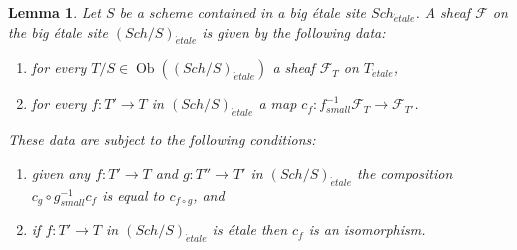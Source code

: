 \documentclass{stacks-project}
\theoremstyle{plain}
\newtheorem{lemma}[subsection]{Lemma}
\theoremstyle{definition}
\theoremstyle{remark}
\numberwithin{equation}{subsection}
\def\Sch{\mathit{Sch}}
\def\Ob{\mathop{\mathrm{Ob}}\nolimits}
\def\etale{{\acute{e}tale}}
\begin{document}
\begin{lemma}
\label{lemma-characterize-sheaf-big-etale}
Let $S$ be a scheme contained in a big \'etale site
$\Sch_\etale$.
A sheaf $\mathcal{F}$ on the big \'etale site
$(\Sch/S)_\etale$ is given by the following data:
\begin{enumerate}
\item for every $T/S \in \Ob((\Sch/S)_\etale)$ a sheaf
$\mathcal{F}_T$ on $T_\etale$,
\item for every $f : T' \to T$ in
$(\Sch/S)_\etale$ a map
$c_f : f_{small}^{-1}\mathcal{F}_T \to \mathcal{F}_{T'}$.
\end{enumerate}
These data are subject to the following conditions:
\begin{enumerate}
\item[(a)] given any $f : T' \to T$ and $g : T'' \to T'$ in
$(\Sch/S)_\etale$ the composition
$c_g \circ g_{small}^{-1}c_f$ is equal to $c_{f \circ g}$, and
\item[(b)] if $f : T' \to T$ in $(\Sch/S)_\etale$
is \'etale then $c_f$ is an isomorphism.
\end{enumerate}
\end{lemma}
\end{document}
